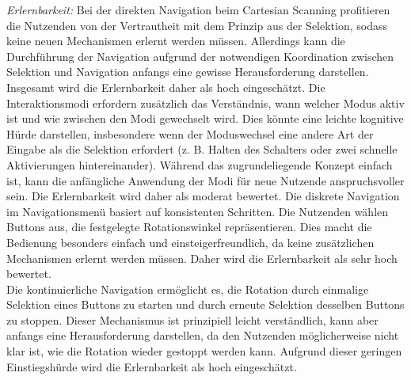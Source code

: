 \textit{Erlernbarkeit:} 
Bei der direkten Navigation beim Cartesian Scanning profitieren die Nutzenden von der Vertrautheit mit dem Prinzip aus der Selektion, sodass keine neuen Mechanismen erlernt werden müssen. Allerdings kann die Durchführung der Navigation aufgrund der notwendigen Koordination zwischen Selektion und Navigation anfangs eine gewisse Herausforderung darstellen. Insgesamt wird die Erlernbarkeit daher als hoch eingeschätzt. Die Interaktionsmodi erfordern zusätzlich das Verständnis, wann welcher Modus aktiv ist und wie zwischen den Modi gewechselt wird. Dies könnte eine leichte kognitive Hürde darstellen, insbesondere wenn der Moduswechsel eine andere Art der Eingabe als die Selektion erfordert (z. B. Halten des Schalters oder zwei schnelle Aktivierungen hintereinander). Während das zugrundeliegende Konzept einfach ist, kann die anfängliche Anwendung der Modi für neue Nutzende anspruchsvoller sein. Die Erlernbarkeit wird daher als moderat bewertet.
Die diskrete Navigation im Navigationsmenü basiert auf konsistenten Schritten. Die Nutzenden wählen Buttons aus, die festgelegte Rotationswinkel repräsentieren. Dies macht die Bedienung besonders einfach und einsteigerfreundlich, da keine zusätzlichen Mechanismen erlernt werden müssen. Daher wird die Erlernbarkeit als sehr hoch bewertet.\\
Die kontinuierliche Navigation ermöglicht es, die Rotation durch einmalige Selektion eines Buttons zu starten und durch erneute Selektion desselben Buttons zu stoppen. Dieser Mechanismus ist prinzipiell leicht verständlich, kann aber anfangs eine Herausforderung darstellen, da den Nutzenden möglicherweise nicht klar ist, wie die Rotation wieder gestoppt werden kann. Aufgrund dieser geringen Einstiegshürde wird die Erlernbarkeit als hoch eingeschätzt.

